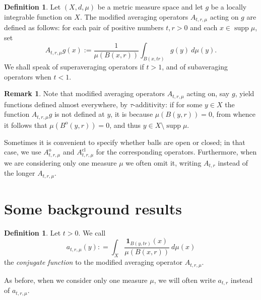 \documentclass[12pt]{amsart}
\theoremstyle{definition}
\newtheorem{definition}[theorem]{Definition}
\newtheorem{remark}[theorem]{Remark}
\theoremstyle{parrafo}
\begin{document}
	
		\begin{definition}\label{modaver} Let  $(X, d, \mu)$ be a metric measure space and let $g$ be  a locally integrable function 
	on $X$. The modified 
	averaging operators $A_{t, r, \mu}$ acting on $g$ are defined as follows: for each pair of positive numbers $t, r > 0$ and each $x\in \operatorname{supp}\mu$, set
	\begin{equation}\label{avop}
		A_{t, r , \mu} g(x) := \frac{1}{\mu
			(B(x, r))} \int _{B(x, tr)}  g (y) \ d\mu (y).
	\end{equation}
We shall speak of superaveraging operators if $t > 1$,  and of  subaveraging  operators when $t < 1$.
\end{definition}

\begin{remark} 
Note that  modified averaging operators $A_{t, r, \mu}$ acting on, say $g$, yield functions defined  almost everywhere,  by
$\tau$-additivity: if for some $y\in X$ the function $A_{t, r, \mu} g$ is not defined at $y$, it is because $\mu (B(y,r) ) = 0$, from whence it follows that $\mu (B^{\operatorname{o}}(y,r)) = 0$, and thus $y \in X \setminus \operatorname{supp}\mu $. 
\end{remark}
	
	 Sometimes it is convenient to  specify whether balls are open or closed; in that case,
	we use $A_{t,r , \mu}^{\operatorname{o}} $ and $A_{t,r , \mu}^{\operatorname{cl}} $ for the corresponding operators. 
	Furthermore, when we are considering only one measure $\mu$ we often omit it, 
	writing $A_{t, r } $ instead of the longer $A_{t, r , \mu} $. 
	
	\section{Some background results}
	
		\begin{definition} \label{conjugate} Let $t > 0$. We call 
		\begin{equation*}\label{conjug}
			a_{t,r, \mu} (y)  
			: =
			\int_{X}  \frac{\mathbf{1}_{B(y,tr)}(x)}{\mu (B(x,r))}  \  d\mu(x) 
		\end{equation*}
		the {\em conjugate function} to the modified averaging operator $A_{t, r, \mu}$.
	\end{definition}
As before, when we consider only one measure $\mu$,  we will often 
write $a_{t, r } $ instead of $a_{t, r , \mu} $.
\end{document}

